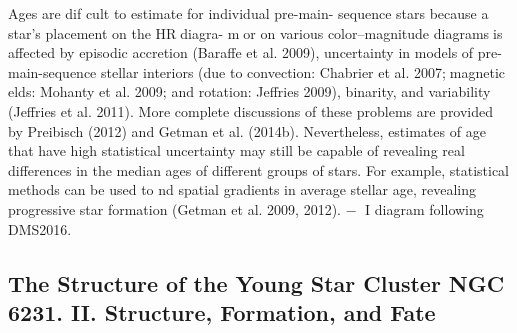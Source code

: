 \documentclass[../main.tex]{subfiles}
\begin{document}
Ages are dif cult to estimate for individual pre-main-
sequence stars because a star’s placement on the HRdiagra-
mor on various color–magnitude diagramsis affected by
episodic accretion (Baraffe et al. 2009), uncertainty in models
of pre-main-sequence stellar interiors (due to convection:
Chabrier et al. 2007;magnetic elds: Mohanty et al. 2009;
and rotation: Jeffries 2009), binarity, and variability (Jeffries
et al. 2011). More complete discussions of these problems are
provided by Preibisch (2012) and Getman et al. (2014b).
Nevertheless, estimates of age that have high statistical
uncertainty may still be capable of revealing real differences
in the median ages of different groups of stars. For example,
statistical methods can be used to nd spatial gradients in
average stellar age, revealing progressive star formation
(Getman et al. 2009, 2012).
−
I diagram
following DMS2016.

\subsection{The Structure of the Young Star Cluster NGC 6231. II. Structure, Formation, and Fate}

\end{document}
